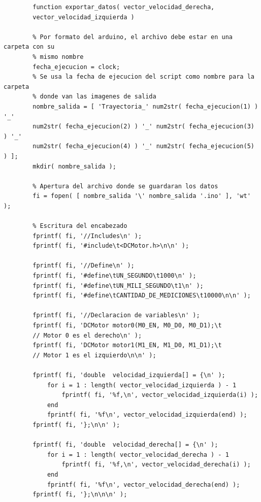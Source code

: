 \documentclass[12pt,a4paper]{article}
\begin{document}
        \begin{verbatim}
        function exportar_datos( vector_velocidad_derecha,
        vector_velocidad_izquierda )

        % Por formato del arduino, el archivo debe estar en una carpeta con su
        % mismo nombre
        fecha_ejecucion = clock;
        % Se usa la fecha de ejecucion del script como nombre para la carpeta
        % donde van las imagenes de salida
        nombre_salida = [ 'Trayectoria_' num2str( fecha_ejecucion(1) ) '_'
        num2str( fecha_ejecucion(2) ) '_' num2str( fecha_ejecucion(3) ) '_'
        num2str( fecha_ejecucion(4) ) '_' num2str( fecha_ejecucion(5) ) ];
        mkdir( nombre_salida );

        % Apertura del archivo donde se guardaran los datos
        fi = fopen( [ nombre_salida '\' nombre_salida '.ino' ], 'wt' );

        % Escritura del encabezado
        fprintf( fi, '//Includes\n' );
        fprintf( fi, '#include\t<DCMotor.h>\n\n' );

        fprintf( fi, '//Define\n' );
        fprintf( fi, '#define\tUN_SEGUNDO\t1000\n' );
        fprintf( fi, '#define\tUN_MILI_SEGUNDO\t1\n' );
        fprintf( fi, '#define\tCANTIDAD_DE_MEDICIONES\t10000\n\n' );

        fprintf( fi, '//Declaracion de variables\n' );
        fprintf( fi, 'DCMotor motor0(M0_EN, M0_D0, M0_D1);\t
        // Motor 0 es el derecho\n' );
        fprintf( fi, 'DCMotor motor1(M1_EN, M1_D0, M1_D1);\t
        // Motor 1 es el izquierdo\n\n' );

        fprintf( fi, 'double  velocidad_izquierda[] = {\n' );
            for i = 1 : length( vector_velocidad_izquierda ) - 1
                fprintf( fi, '%f,\n', vector_velocidad_izquierda(i) );
            end
            fprintf( fi, '%f\n', vector_velocidad_izquierda(end) );
        fprintf( fi, '};\n\n' );

        fprintf( fi, 'double  velocidad_derecha[] = {\n' );
            for i = 1 : length( vector_velocidad_derecha ) - 1
                fprintf( fi, '%f,\n', vector_velocidad_derecha(i) );
            end
            fprintf( fi, '%f\n', vector_velocidad_derecha(end) );
        fprintf( fi, '};\n\n\n' );


\end{verbatim}
\end{document}
